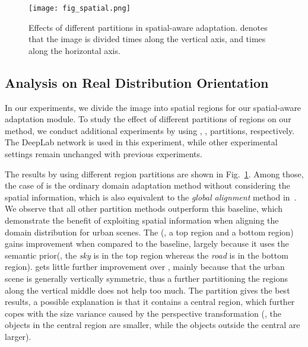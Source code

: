 \documentclass[10pt,twocolumn,letterpaper]{article}
\begin{document}
\begin{figure}
\centering
\texttt{[image: fig\_spatial.png]}
\caption{Effects of different partitions in spatial-aware adaptation.  denotes that the image is divided  times along the vertical axis, and  times along the horizontal axis.}
\label{fig:spatial}
\vspace{-4mm}
\end{figure}

\subsection{Analysis on Real Distribution Orientation}
\label{sec:exp_rdo}
In our experiments, we divide the image into  spatial regions for our spatial-aware adaptation module. To study the effect of different partitions of regions on our method, we conduct additional experiments by using , ,  partitions, respectively. The DeepLab network is used in this experiment, while other experimental settings remain unchanged with previous experiments. 

The results by using different region partitions are shown in Fig.~\ref{fig:spatial}. Among those, the case of  is the ordinary domain adaptation method without considering the spatial information, which is also equivalent to the \textit{global alignment} method in~\cite{hoffman2016fcns}. We observe that all other partition methods outperform this baseline, which demonstrate the benefit of exploiting spatial information when aligning the domain distribution for urban scenes. The  (\ie, a top region and a bottom region) gains improvement when compared to the baseline, largely because it uses the semantic prior(\eg, the \textit{sky} is in the top region whereas the \textit{road} is in the bottom region).  gets little further improvement over ,  mainly because that the urban scene is generally vertically symmetric, thus a further partitioning the regions along the vertical middle does not help too much. The  partition gives the best results, a possible explanation is that it contains a central region, which further copes with the size variance caused by the perspective transformation (\eg, the objects in the central region are smaller, while the objects outside the central are larger).
\end{document}
